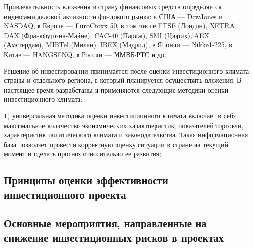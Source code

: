 Привлекательность вложения в страну финансовых средств определяется индексами деловой активности фондового рынка: в США --- DowJones и NASDAQ, в Европе --- EuroCtoxx 50,  в том числе FTSE (Лондон), XETRA DAX (Франкфурт-на-Майне), CAC-40 (Париж), SMI (Цюрих), AEX (Амстердам), MIBTel (Милан), IBEX (Мадрид), в Японии --- Nikke1-225, в Китае --- HANGSENQ, в России --- ММВБ-РТС и др.

Решение об инвестировании принимается после оценки инвестиционного климата страны и отдельного региона, в который планируется осуществить вложения.
В настоящее время разработаны и применяются следующие методики оценки инвестиционного климата:

1) универсальная методика оценки инвестиционного климата включает в себя максимальное количество экономических характоеристик, показателей торговли, характеристик политического климата и законодательства.
Такая информационная база позволяет провести корректную оценку ситуации в стране на текущий момент и сделать прогноз относительно ее развития;

















\subsection{Принципы оценки эффективности инвестиционного проекта}
\subsection{Основные мероприятия, направленные на снижение инвестиционных рисков в проектах}